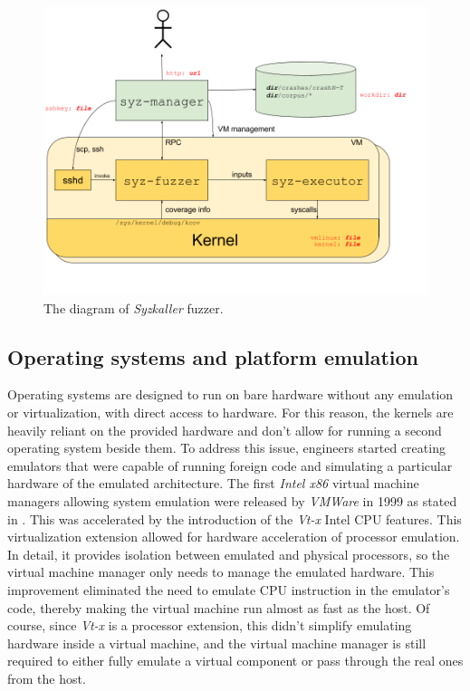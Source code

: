 \begin{figure}
    \centering
    \includegraphics[width=.9\linewidth]{tex/img/syz.png}
    \caption{The diagram of \textit{Syzkaller} fuzzer.}
    \label{fig:syz}
\end{figure}

\subsection{Operating systems and platform emulation}
Operating systems are designed to run on bare hardware without any emulation or virtualization, with direct access to hardware. For this reason, the kernels are heavily reliant on the provided hardware and don't allow for running a second operating system beside them. To address this issue, engineers started creating emulators that were capable of running foreign code and simulating a particular hardware of the emulated architecture. The first \textit{Intel x86} virtual machine managers allowing system emulation were released by \textit{VMWare} in 1999 as stated in \cite{vms}. This was accelerated by the introduction of the \textit{Vt-x} Intel CPU features. This virtualization extension allowed for hardware acceleration of processor emulation. In detail, it provides isolation between emulated and physical processors, so the virtual machine manager only needs to manage the emulated hardware. This improvement eliminated the need to emulate CPU instruction in the emulator's code, thereby making the virtual machine run almost as fast as the host. Of course, since \textit{Vt-x} is a processor extension, this didn't simplify emulating hardware inside a virtual machine, and the virtual machine manager is still required to either fully emulate a virtual component or pass through the real ones from the host. 

